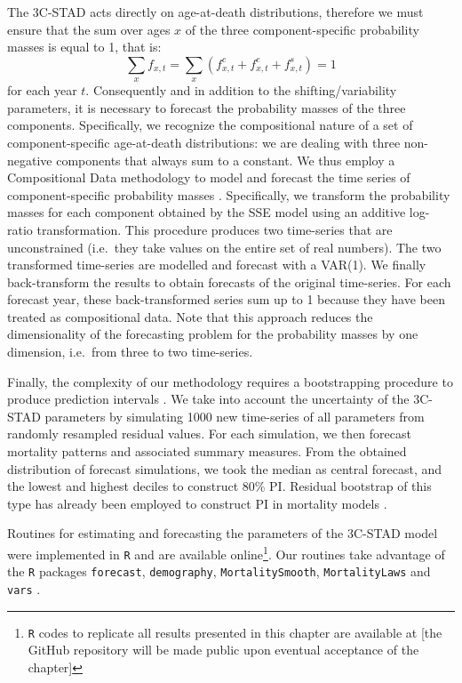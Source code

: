 \documentclass[11pt, a4paper]{article}
\begin{document}
The 3C-STAD acts directly on age-at-death distributions, therefore we must ensure that the sum over ages $x$ of the three component-specific probability masses is equal to 1, that is:
%
\begin{equation}\label{Eq:Masses}
\sum_{x} f_{x,t} = \sum_{x} \left( f^{c}_{x,t}+f^{e}_{x,t}+f^{s}_{x,t}  \right) = 1
\end{equation}
% 
for each year $t$. Consequently and in addition to the shifting/variability parameters, it is necessary to forecast the probability masses of the three components. Specifically, we recognize the compositional nature of a set of component-specific age-at-death distributions: we are dealing with three non-negative components that always sum to a constant. We thus employ a Compositional Data methodology to model and forecast the time series of component-specific probability masses \citep{aitchison1986statistical, CoDa2011}. Specifically, we transform the probability masses for each component obtained by the SSE model using an additive log-ratio transformation. This procedure produces two time-series that are unconstrained (i.e.~they take values on the entire set of real numbers). The two transformed time-series are modelled and forecast with a VAR(1). We finally back-transform the results to obtain forecasts of the original time-series. For each forecast year, these back-transformed series sum up to 1 because they have been treated as compositional data. Note that this approach reduces the dimensionality of the forecasting problem for the probability masses by one dimension, i.e.~from three to two time-series.

Finally, the complexity of our methodology requires a bootstrapping procedure to produce prediction intervals \citep[PI,][]{efron1994introduction}. We take into account the uncertainty of the 3C-STAD parameters by simulating 1000 new time-series of all parameters from randomly resampled residual values. For each simulation, we then forecast mortality patterns and associated summary measures. From the obtained distribution of forecast simulations, we took the median as central forecast, and the lowest and highest deciles to construct 80\% PI. Residual bootstrap of this type has already been employed to construct PI in mortality models \citep{bergeron2017coherent, basellini2019stad}.

Routines for estimating and forecasting the parameters of the 3C-STAD model were implemented in \texttt{R} \citep{Rcite} and are available online\footnote{\texttt{R} codes to replicate all results presented in this chapter are available at [the GitHub repository will be made public upon eventual acceptance of the chapter]}. Our routines take advantage of the \texttt{R} packages \texttt{forecast}, \texttt{demography}, \texttt{MortalitySmooth}, \texttt{MortalityLaws} and \texttt{vars} \citep{pfaff2008analysis,pfaff2008var,hyndman2008automatic,camarda2012mortalitysmooth,hyndman2018forecastR,demogRpackage,pascariu2018mortalitylaws}.  
\end{document}
